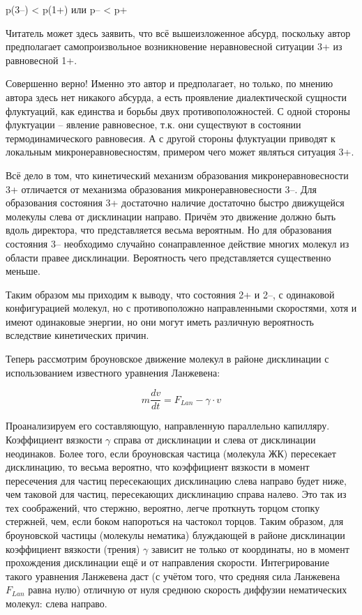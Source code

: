 \documentclass[11pt]{article}
\begin{document}
p(3--) \textless{} p(1+) или p-- \textless{} p+

Читатель может здесь заявить, что всё вышеизложенное абсурд, поскольку
автор предполагает самопроизвольное возникновение неравновесной ситуации
3+ из равновесной 1+.

Совершенно верно! Именно это автор и предполагает, но только, по мнению
автора здесь нет никакого абсурда, а есть проявление диалектической
сущности флуктуаций, как единства и борьбы двух противоположностей. С
одной стороны флуктуации -- явление равновесное, т.к. они существуют в
состоянии термодинамического равновесия. А с другой стороны флуктуации
приводят к локальным микронеравновесностям, примером чего может являться
ситуация 3+.

Всё дело в том, что кинетический механизм образования
микронеравновесности 3+ отличается от механизма образования
микронеравновесности 3--. Для образования состояния 3+ достаточно
наличие достаточно быстро движущейся молекулы слева от дисклинации
направо. Причём это движение должно быть вдоль директора, что
представляется весьма вероятным. Но для образования состояния 3--
необходимо случайно сонаправленное действие многих молекул из области
правее дисклинации. Вероятность чего представляется существенно меньше.

Таким образом мы приходим к выводу, что состояния 2+ и 2--, с одинаковой
конфигурацией молекул, но с противоположно направленными скоростями,
хотя и имеют одинаковые энергии, но они могут иметь различную
вероятность вследствие кинетических причин.

    Теперь рассмотрим броуновское движение молекул в районе дисклинации с
использованием известного уравнения Ланжевена:

\[m\frac{dv}{dt}=F_{Lan}-\gamma \cdot v\]

Проанализируем его составляющую, направленную параллельно капилляру.
Коэффициент вязкости \(\gamma\) справа от дисклинации и слева от
дисклинации неодинаков. Более того, если броуновская частица (молекула
ЖК) пересекает дисклинацию, то весьма вероятно, что коэффициент вязкости
в момент пересечения для частиц пересекающих дисклинацию слева направо
будет ниже, чем таковой для частиц, пересекающих дисклинацию справа
налево. Это так из тех соображений, что стержню, вероятно, легче
проткнуть торцом стопку стержней, чем, если боком напороться на частокол
торцов. Таким образом, для броуновской частицы (молекулы нематика)
блуждающей в районе дисклинации коэффициент вязкости (трения) \(\gamma\)
зависит не только от координаты, но в момент прохождения дисклинации ещё
и от направления скорости. Интегрирование такого уравнения Ланжевена
даст (с учётом того, что средняя сила Ланжевена \(F_{Lan}\) равна нулю)
отличную от нуля среднюю скорость диффузии нематических молекул: слева
направо.
\end{document}
